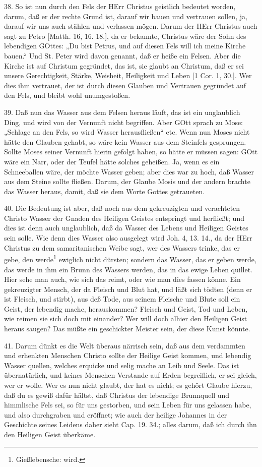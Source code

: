 38. So ist nun durch den Fels der HErr Christus geistlich bedeutet worden, darum, daß er der rechte Grund ist, darauf wir bauen und vertrauen sollen, ja, darauf wir uns auch stählen und verlassen mögen. Darum der HErr Christus auch sagt zu Petro [Matth. 16, 16. 18.], da er bekannte, Christus wäre der Sohn des lebendigen GOttes: „Du bist Petrus, und auf diesen Fels will ich meine Kirche bauen.“ Und St. Peter wird davon genannt, daß er heiße ein Felsen. Aber die Kirche ist auf Christum gegründet, das ist, sie glaubt an Christum, daß er sei unsere Gerechtigkeit, Stärke, Weisheit, Heiligkeit und Leben [1 Cor. 1, 30.]. Wer dies ihm vertrauet, der ist durch diesen Glauben und Vertrauen gegründet auf den Fels, und bleibt wohl unumgestoßen.

39. Daß nun das Wasser aus dem Felsen heraus läuft, das ist ein unglaublich Ding, und wird von der Vernunft nicht begriffen. Aber GOtt sprach zu Mose: „Schlage an den Fels, so wird Wasser herausfließen“ etc. Wenn nun Moses nicht hätte den Glauben gehabt, so wäre kein Wasser aus dem Steinfels gesprungen. Sollte Moses seiner Vernunft hierin gefolgt haben, so hätte er müssen sagen: GOtt wäre ein Narr, oder der Teufel hätte solches geheißen. Ja, wenn es ein Schneeballen wäre, der möchte Wasser geben; aber dies war zu hoch, daß Wasser aus dem Steine sollte fließen. Darum, der Glaube Mosis und der andern brachte das Wasser heraus, damit, daß sie dem Worte Gottes getraueten.

40. Die Bedeutung ist aber, daß noch aus dem gekreuzigten und verachteten Christo Wasser der Gnaden des Heiligen Geistes entspringt und herfließt; und dies ist denn auch unglaublich, daß da Wasser des Lebens und Heiligen Geistes sein solle. Wie denn dies Wasser also ausgelegt wird Joh. 4, 13. 14., da der HErr Christus zu dem samaritanischen Weibe sagt, wer des Wassers trinke, das er gebe, den werde\footnote{Gießlebensche: wird.} ewiglich nicht dürsten; sondern das Wasser, das er geben werde, das werde in ihm ein Brunn des Wassers werden, das in das ewige Leben quillet. Hier sehe man auch, wie sich das reimt, oder wie man dies fassen könne. Ein gekreuzigter Mensch, der da Fleisch und Blut hat, und läßt sich tödten (denn er ist Fleisch, und stirbt), aus deß Tode, aus seinem Fleische und Blute soll ein Geist, der lebendig mache, herauskommen? Fleisch und Geist, Tod und Leben, wie reimen sie sich doch mit einander? Wer will doch alhier den Heiligen Geist heraus saugen? Das müßte ein geschickter Meister sein, der diese Kunst könnte.

41. Darum dünkt es die Welt überaus närrisch sein, daß aus dem verdammten und erhenkten Menschen Christo sollte der Heilige Geist kommen, und lebendig Wasser quellen, welches erquicke und selig mache an Leib und Seele. Das ist übernatürlich, und keines Menschen Verstande auf Erden begreiflich, er sei gleich, wer er wolle. Wer es nun nicht glaubt, der hat es nicht; es gehört Glaube hierzu, daß du es gewiß dafür hältst, daß Christus der lebendige Brunnquell und himmlische Fels sei, so für uns gestorben, und sein Leben für uns gelassen habe, und also durchgraben und eröffnet; wie auch der heilige Johannes in der Geschichte seines Leidens daher sieht Cap. 19. 34.; alles darum, daß ich durch ihn den Heiligen Geist überkäme.


